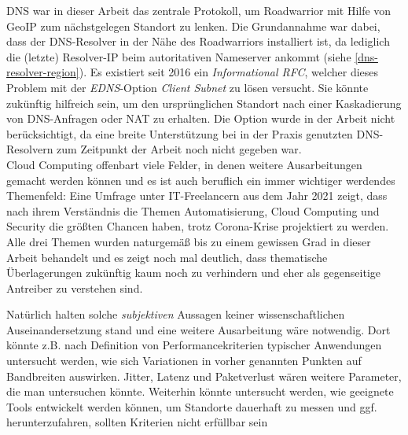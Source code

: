 DNS war in dieser Arbeit das zentrale Protokoll, um \gls{Roadwarrior} mit Hilfe von \gls{GeoIP} zum nächstgelegen Standort zu lenken. Die Grundannahme war dabei, dass der \gls{DNS}-Resolver in der Nähe des \gls{Roadwarrior}s installiert ist, da lediglich die (letzte) Resolver-IP beim autoritativen Nameserver ankommt (siehe \ref{dns-resolver-region}). Es existiert seit 2016 ein \textit{Informational \gls{RFC}}, welcher dieses Problem mit der \textit{EDNS}-Option \textit{\gls{Client} Subnet} zu lösen versucht\cite{rfc7871}. Sie könnte zukünftig hilfreich sein, um den ursprünglichen Standort nach einer Kaskadierung von \gls{DNS}-Anfragen oder \gls{NAT} zu erhalten. Die Option wurde in der Arbeit nicht berücksichtigt, da eine breite Unterstützung bei in der Praxis genutzten \gls{DNS}-Resolvern zum Zeitpunkt der Arbeit noch nicht gegeben war.\\ 
Cloud Computing offenbart viele Felder, in denen weitere Ausarbeitungen gemacht werden können und es ist auch beruflich ein immer wichtiger werdendes Themenfeld:
Eine Umfrage unter IT-Freelancern aus dem Jahr 2021 zeigt, dass nach ihrem Verständnis die Themen Automatisierung, Cloud Computing und Security die größten Chancen haben, trotz Corona-Krise projektiert zu werden\cite{SOLCOMGmbH2021}. Alle drei Themen wurden \glqq naturgemäß\grqq{} bis zu einem gewissen Grad in dieser Arbeit behandelt und es zeigt noch mal deutlich, dass thematische Überlagerungen zukünftig kaum noch zu verhindern und eher als gegenseitige Antreiber zu verstehen sind.

\iffalse


Natürlich halten solche \textit{subjektiven} Aussagen keiner wissenschaftlichen Auseinandersetzung stand und eine weitere Ausarbeitung wäre notwendig. Dort könnte z.B. nach Definition von Performancekriterien typischer Anwendungen untersucht werden, wie sich Variationen in vorher genannten Punkten auf Bandbreiten auswirken. Jitter, Latenz und Paketverlust wären weitere Parameter, die man untersuchen könnte. Weiterhin könnte untersucht werden, wie geeignete Tools entwickelt werden können, um Standorte dauerhaft zu messen und ggf. herunterzufahren, sollten Kriterien nicht erfüllbar sein

